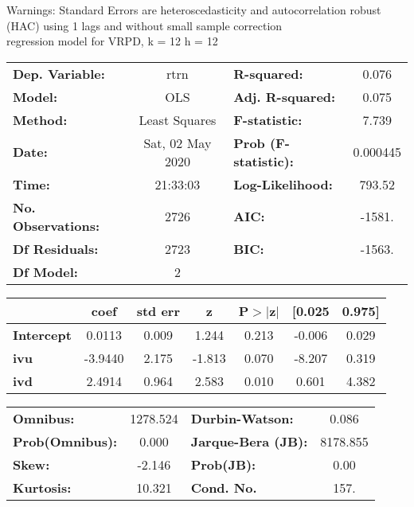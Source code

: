 Warnings: \newline
 [1] Standard Errors are heteroscedasticity and autocorrelation robust (HAC) using 1 lags and without small sample correction\\ 

regression model for VRPD, k = 12 h = 12\begin{center}
\begin{tabular}{lclc}
\toprule
\textbf{Dep. Variable:}    &       rtrn       & \textbf{  R-squared:         } &     0.076   \\
\textbf{Model:}            &       OLS        & \textbf{  Adj. R-squared:    } &     0.075   \\
\textbf{Method:}           &  Least Squares   & \textbf{  F-statistic:       } &     7.739   \\
\textbf{Date:}             & Sat, 02 May 2020 & \textbf{  Prob (F-statistic):} &  0.000445   \\
\textbf{Time:}             &     21:33:03     & \textbf{  Log-Likelihood:    } &    793.52   \\
\textbf{No. Observations:} &        2726      & \textbf{  AIC:               } &    -1581.   \\
\textbf{Df Residuals:}     &        2723      & \textbf{  BIC:               } &    -1563.   \\
\textbf{Df Model:}         &           2      & \textbf{                     } &             \\
\bottomrule
\end{tabular}
\begin{tabular}{lcccccc}
                   & \textbf{coef} & \textbf{std err} & \textbf{z} & \textbf{P$> |$z$|$} & \textbf{[0.025} & \textbf{0.975]}  \\
\midrule
\textbf{Intercept} &       0.0113  &        0.009     &     1.244  &         0.213        &       -0.006    &        0.029     \\
\textbf{ivu}       &      -3.9440  &        2.175     &    -1.813  &         0.070        &       -8.207    &        0.319     \\
\textbf{ivd}       &       2.4914  &        0.964     &     2.583  &         0.010        &        0.601    &        4.382     \\
\bottomrule
\end{tabular}
\begin{tabular}{lclc}
\textbf{Omnibus:}       & 1278.524 & \textbf{  Durbin-Watson:     } &    0.086  \\
\textbf{Prob(Omnibus):} &   0.000  & \textbf{  Jarque-Bera (JB):  } & 8178.855  \\
\textbf{Skew:}          &  -2.146  & \textbf{  Prob(JB):          } &     0.00  \\
\textbf{Kurtosis:}      &  10.321  & \textbf{  Cond. No.          } &     157.  \\
\bottomrule
\end{tabular}
\end{center}


